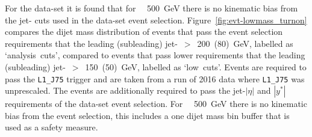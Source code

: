 For the \lm{} data-set it is found that for \mjj~\gt~500~GeV there is no kinematic bias
from the jet-\pT{} cuts used in the \lm{} data-set event selection.
Figure~\ref{fig:evt-lowmass_turnon} compares the dijet mass distribution of events
that pass the event selection requirements that the leading (subleading) jet-\pT{}~$>$~200~(80)~GeV, labelled as `analysis~cuts',
compared to events that pass lower requirements that the leading (subleading) jet-\pT{}~$>$~150~(50)~GeV, labelled as `low~cuts'.
Events are required to pass the \verb|L1_J75| trigger and are taken from a run of 2016 data where \verb|L1_J75| was unprescaled.
The events are additionally required to pass the jet-$|\eta|$ and $|y^*|$ requirements of the \lm{} data-set event selection.
For \mjj~\gt~500~GeV there is no kinematic bias from the \lm{} event selection,
this includes a one dijet mass bin buffer that is used as a safety measure.



